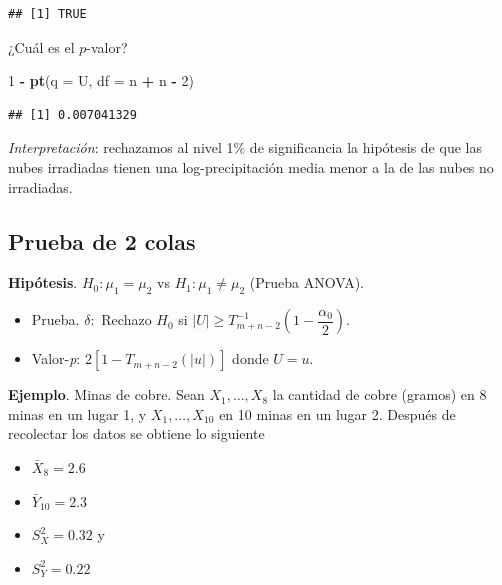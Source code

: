 \documentclass[
  12pt,
]{book}
\newenvironment{Shaded}{\begin{snugshade}}{\end{snugshade}}
\newcommand{\DataTypeTok}[1]{\textcolor[rgb]{0.13,0.29,0.53}{#1}}
\newcommand{\DecValTok}[1]{\textcolor[rgb]{0.00,0.00,0.81}{#1}}
\newcommand{\KeywordTok}[1]{\textcolor[rgb]{0.13,0.29,0.53}{\textbf{#1}}}
\newcommand{\NormalTok}[1]{#1}
\newcommand{\OperatorTok}[1]{\textcolor[rgb]{0.81,0.36,0.00}{\textbf{#1}}}
\newcommand{\StringTok}[1]{\textcolor[rgb]{0.31,0.60,0.02}{#1}}
\providecommand{\tightlist}{%
  \setlength{\itemsep}{0pt}\setlength{\parskip}{0pt}}
\begin{document}
\begin{verbatim}
## [1] TRUE
\end{verbatim}

¿Cuál es el \(p\)-valor?

\begin{Shaded}
\begin{Highlighting}[]
\DecValTok{1} \OperatorTok{{-}}\StringTok{ }\KeywordTok{pt}\NormalTok{(}\DataTypeTok{q =}\NormalTok{ U, }\DataTypeTok{df =}\NormalTok{ n }\OperatorTok{+}\StringTok{ }\NormalTok{n }\OperatorTok{{-}}\StringTok{ }\DecValTok{2}\NormalTok{)}
\end{Highlighting}
\end{Shaded}

\begin{verbatim}
## [1] 0.007041329
\end{verbatim}

\emph{Interpretación}: rechazamos al nivel 1\% de significancia la hipótesis de que las nubes irradiadas tienen una log-precipitación media menor a la de las nubes no irradiadas.

\hypertarget{prueba-de-2-colas}{%
\subsection{Prueba de 2 colas}\label{prueba-de-2-colas}}

\textbf{Hipótesis}. \(H_0: \mu_1=\mu_2\) vs \(H_1: \mu_1\ne\mu_2\) (Prueba ANOVA).

\begin{itemize}
\item
  Prueba. \(\delta:\) Rechazo \(H_0\) si \(|U|\geq T^{-1}_{m+n-2}\left(1-\dfrac{\alpha_0}2\right)\).
\item
  Valor-\emph{p}: \(2[1-T_{m+n-2}(|u|)]\) donde \(U=u\).
\end{itemize}

\textbf{Ejemplo}. Minas de cobre. Sean \(X_1,\dots,X_8\) la cantidad de cobre (gramos)
en 8 minas en un lugar 1, y \(X_1,\dots,X_{10}\) en 10 minas en un lugar 2.
Después de recolectar los datos se obtiene lo siguiente

\begin{itemize}
\tightlist
\item
  \(\bar X_8 = 2.6\)
\item
  \(\bar Y_{10} = 2.3\)
\item
  \(S_X^2 = 0.32\) y
\item
  \(S_Y^2=0.22\)
\end{itemize}
\end{document}
